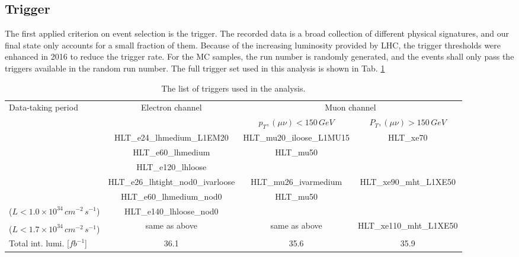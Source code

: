 \subsection{Trigger}
\label{Subsec:Trigger_resonance}
The first applied criterion on event selection is the trigger. The recorded data is a broad collection of different physical signatures, and our final state only accounts for a small fraction of them. Because of the increasing luminosity provided by LHC, the trigger thresholds were enhanced in 2016 to reduce the trigger rate. For the MC samples, the run number is randomly generated, and the events shall only pass the triggers available in the random run number. The full trigger set used in this analysis is shown in Tab. \ref{tab:triggers}
\begin{table}[h]
	\caption{The list of triggers used in the analysis. } \label{tab:triggers}
	
		\footnotesize
		\begin{center}
		\begin{adjustbox}{center}
			\begin{tabular}{|l|c|c|c|}
				\hline
				\multirow{2}{*}{Data-taking period} & \multirow{2}{*}{Electron channel} & \multicolumn{2}{c|}{ Muon channel }  \\
				\cline{3-4}
				& & $p_{T},\left(\mu\nu\right) < 150\,GeV$ & $P_{T},\left(\mu\nu\right) > 150\,GeV$   \\
				\hline
				\multirow{3}{*}{\centering {2015}} & HLT\_e24\_lhmedium\_L1EM20 & HLT\_mu20\_iloose\_L1MU15 & \multirow{3}{*}{ HLT\_xe70 } \\
				& HLT\_e60\_lhmedium  & HLT\_mu50 & \\
				& HLT\_e120\_lhloose & & \\
				\hline
				\multirow{2}{*}{\centering {2016a (run $< 302919$)}} & HLT\_e26\_lhtight\_nod0\_ivarloose & HLT\_mu26\_ivarmedium  & \multirow{3}{*}{ HLT\_xe90\_mht\_L1XE50 } \\
				& HLT\_e60\_lhmedium\_nod0 & HLT\_mu50 &  \\
				($L<1.0\times10^{34}\,{ cm}^{-2}\,{s}^{-1}$) & HLT\_e140\_lhloose\_nod0 & & \\
				\hline
				{\centering {2016b (run $\geq 302919$)}} & \multirow{2}{*}{same as above} & \multirow{2}{*}{same as above}  &  \multirow{2}{*}{HLT\_xe110\_mht\_L1XE50} \\
				($L<1.7\times10^{34}\,{ cm}^{-2}\,{ s}^{-1}$) & & &\\
				\hline
				\hline
				Total int. lumi. [$fb^{-1}$] &  36.1 & 35.6 & 35.9 \\
				\hline
			\end{tabular}
		\end{adjustbox}
		\end{center}
	
\end{table}
